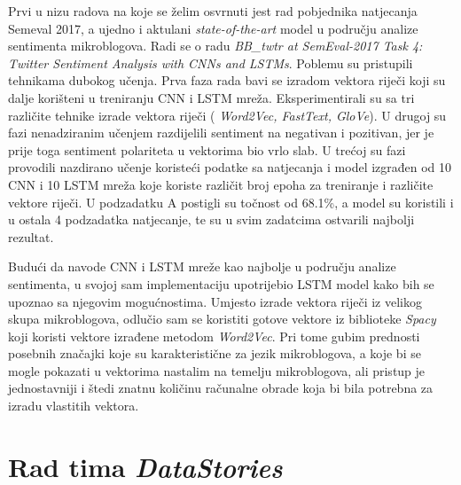 \documentclass[times, utf8, zavrsni]{fer}
\begin{document}
Prvi u nizu radova na koje se želim osvrnuti jest rad pobjednika natjecanja Semeval 2017, a ujedno i aktulani \textit{state-of-the-art} model u području analize sentimenta mikroblogova. Radi se o radu \textit{BB\_twtr at SemEval-2017 Task 4: Twitter Sentiment Analysis with CNNs and LSTMs}\citep{cliche-2017-bb}. Poblemu su pristupili tehnikama dubokog učenja. Prva faza rada bavi se izradom vektora riječi koji su dalje korišteni u treniranju CNN i LSTM mreža. Eksperimentirali su sa tri različite tehnike izrade vektora riječi ( \textit{Word2Vec, FastText, GloVe}). U drugoj su fazi nenadziranim učenjem razdijelili sentiment na negativan i pozitivan, jer je prije toga sentiment polariteta u vektorima bio vrlo slab. U trećoj su fazi provodili nazdirano učenje koristeći podatke sa natjecanja i model izgrađen od 10 CNN i 10 LSTM mreža koje koriste različit broj epoha za treniranje i različite vektore riječi. U podzadatku A postigli su točnost od 68.1\%, a model su koristili i u ostala 4 podzadatka natjecanje, te su u svim zadatcima ostvarili najbolji rezultat.

Budući da navode CNN i LSTM mreže kao najbolje u području analize sentimenta, u svojoj sam implementaciju upotrijebio LSTM model kako bih se upoznao sa njegovim mogućnostima. Umjesto izrade vektora riječi iz velikog skupa mikroblogova, odlučio sam se koristiti gotove vektore iz biblioteke \textit{Spacy} koji koristi vektore izrađene metodom \textit{Word2Vec}. Pri tome gubim prednosti posebnih značajki koje su karakteristične za jezik mikroblogova, a koje bi se mogle pokazati u vektorima nastalim na temelju mikroblogova, ali pristup je jednostavniji i štedi znatnu količinu računalne obrade koja bi bila potrebna za izradu vlastitih vektora.

\section{Rad tima \textit{DataStories}}
\end{document}
